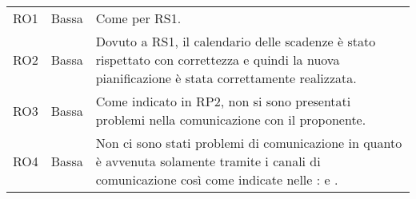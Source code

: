 {\begin{longtable}{C{2cm} C{3cm} C{10cm}}
RO1 &
Bassa &
Come per RS1. \\

RO2 &
Bassa &
Dovuto a RS1, il calendario delle scadenze è stato rispettato con correttezza e quindi la nuova pianificazione è stata correttamente realizzata. \\

RO3 &
Bassa &
Come indicato in RP2, non si sono presentati problemi nella comunicazione con il proponente. \\

RO4 &
Bassa &
Non ci sono stati problemi di comunicazione in quanto è avvenuta solamente tramite i canali di comunicazione così come indicate nelle \NdP{}:  e . \\

\end{longtable}	
}